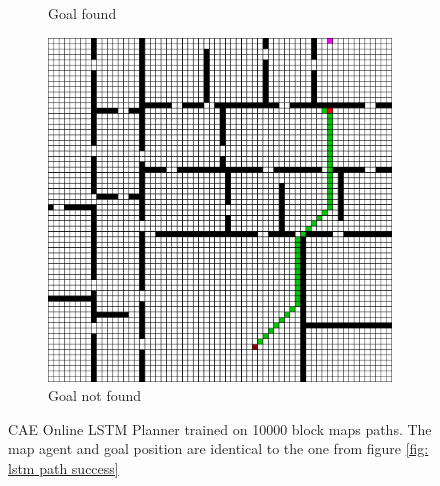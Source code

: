 \begin{figure}[h!]
\begin{subfigure}[b]{0.33\linewidth}
     \caption{Goal found}
  \end{subfigure}
  \hfill
  \begin{subfigure}[b]{0.33\linewidth}
    \includegraphics[width=\linewidth]{images/cae_lstm_3_block.png}
     \caption{Goal not found}
  \end{subfigure}
  \caption{CAE Online LSTM Planner trained on 10000 block maps paths. The map agent and goal position are identical to the one from figure \ref{fig: lstm path success}}
  \label{fig: cae lstm path success}
\end{figure}

